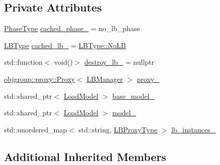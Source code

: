 \subsection*{Private Attributes}
\begin{DoxyCompactItemize}
\item 
\hyperlink{namespacevt_a46ce6733d5cdbd735d561b7b4029f6d7}{Phase\+Type} \hyperlink{structvt_1_1vrt_1_1collection_1_1balance_1_1_l_b_manager_aa15bf182a0d70f1fc756ac8893422777}{cached\+\_\+phase\+\_\+} = no\+\_\+lb\+\_\+phase
\item 
\hyperlink{namespacevt_1_1vrt_1_1collection_1_1balance_ac4f99693509affcc67db182d4aad9b5c}{L\+B\+Type} \hyperlink{structvt_1_1vrt_1_1collection_1_1balance_1_1_l_b_manager_aa21ee592ddcc09c269e546c0ebf47fd3}{cached\+\_\+lb\+\_\+} = \hyperlink{namespacevt_1_1vrt_1_1collection_1_1balance_ac4f99693509affcc67db182d4aad9b5cad12268b59a4f1098aee001f9a1750020}{L\+B\+Type\+::\+No\+LB}
\item 
std\+::function$<$ void()$>$ \hyperlink{structvt_1_1vrt_1_1collection_1_1balance_1_1_l_b_manager_a31af388e759240311470c17ec569155c}{destroy\+\_\+lb\+\_\+} = nullptr
\item 
\hyperlink{structvt_1_1objgroup_1_1proxy_1_1_proxy}{objgroup\+::proxy\+::\+Proxy}$<$ \hyperlink{structvt_1_1vrt_1_1collection_1_1balance_1_1_l_b_manager}{L\+B\+Manager} $>$ \hyperlink{structvt_1_1vrt_1_1collection_1_1balance_1_1_l_b_manager_a4fef6bf68a7aee9980270ceeb5df0c2b}{proxy\+\_\+}
\item 
std\+::shared\+\_\+ptr$<$ \hyperlink{classvt_1_1vrt_1_1collection_1_1balance_1_1_load_model}{Load\+Model} $>$ \hyperlink{structvt_1_1vrt_1_1collection_1_1balance_1_1_l_b_manager_ace781095ef59c156a0b23dea6dea70db}{base\+\_\+model\+\_\+}
\item 
std\+::shared\+\_\+ptr$<$ \hyperlink{classvt_1_1vrt_1_1collection_1_1balance_1_1_load_model}{Load\+Model} $>$ \hyperlink{structvt_1_1vrt_1_1collection_1_1balance_1_1_l_b_manager_a4298255e00b2012d3417a63130dc91c3}{model\+\_\+}
\item 
std\+::unordered\+\_\+map$<$ std\+::string, \hyperlink{structvt_1_1vrt_1_1collection_1_1balance_1_1_l_b_manager_a8b1a7735366beb85c2c2ccc3912cdd80}{L\+B\+Proxy\+Type} $>$ \hyperlink{structvt_1_1vrt_1_1collection_1_1balance_1_1_l_b_manager_aa25f8223d51a33ca1c583b56fd2a98c2}{lb\+\_\+instances\+\_\+}
\end{DoxyCompactItemize}
\subsection*{Additional Inherited Members}


